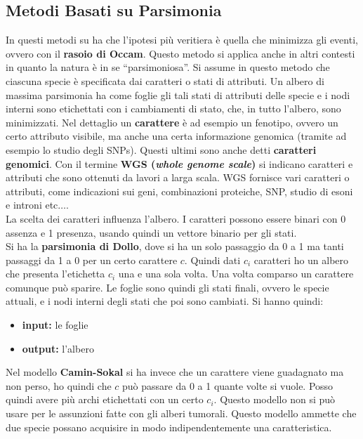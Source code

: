 \documentclass[a4paper,12pt, oneside]{book}
\begin{document}
\subsection{Metodi Basati su Parsimonia}
In questi metodi su ha che l'ipotesi più veritiera è quella che minimizza gli
eventi, ovvero con il \textbf{rasoio di Occam}. Questo metodo si applica anche
in altri contesti in quanto la natura è in se ``parsimoniosa''. Si assume in
questo metodo che ciascuna specie è specificata dai caratteri o stati di
attributi. Un albero di massima parsimonia ha come foglie gli tali stati di
attributi delle specie e
i nodi interni sono etichettati con i cambiamenti di stato, che, in tutto
l'albero, sono minimizzati.
Nel dettaglio un \textbf{carattere} è ad esempio un fenotipo, ovvero un certo
attributo visibile, ma anche una certa informazione genomica (tramite ad esempio
lo studio degli SNPs). Questi ultimi sono anche detti \textbf{caratteri
  genomici}. Con il termine \textbf{WGS (\textit{whole genome scale})} si
indicano caratteri e attributi che sono ottenuti da lavori a larga scala. WGS
fornisce vari caratteri o 
attributi, come indicazioni sui geni, combinazioni proteiche, SNP, studio di
esoni e introni etc$\ldots$.\\
La scelta dei caratteri influenza l'albero. I caratteri possono essere binari
con 0 assenza e 1 presenza, usando quindi un vettore binario per gli stati.\\
Si ha la \textbf{parsimonia di Dollo}, dove si ha un solo passaggio da 0 a 1 ma
tanti passaggi da 1 a 0 per un certo carattere $c$. Quindi dati $c_i$ caratteri
ho un albero che presenta l'etichetta $c_i$ una e una sola volta. Una volta
comparso un carattere comunque può sparire. Le foglie sono quindi gli stati
finali, ovvero le specie attuali, e i nodi interni degli stati che poi sono
cambiati. Si hanno quindi:
\begin{itemize}
  \item \textbf{input:} le foglie
  \item \textbf{output:} l'albero
\end{itemize}
Nel modello \textbf{Camin-Sokal} si ha invece che un carattere viene guadagnato
ma non perso, ho quindi che $c$ può passare da 0 a 1 quante volte si
vuole. Posso quindi avere più archi etichettati con un certo $c_i$. Questo
modello non si può usare per le assunzioni fatte con gli alberi tumorali. Questo
modello ammette che due specie possano acquisire in modo indipendentemente una
caratteristica. 
\end{document}
